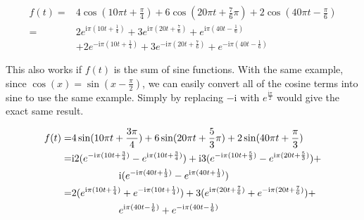 $$\begin{aligned}
    f(t) 
    =& 4\cos(10\pi t+\frac{\pi}{4}) + 6\cos(20\pi t+\frac{7}{6}\pi) + 2\cos(40\pi t-\frac{\pi}{6})  \\
    =& 2e^{\mathrm{i}\pi(10t+\frac{1}{4})} + 3e^{\mathrm{i}\pi(20t+\frac{7}{6})} + e^{\mathrm{i}\pi(40t-\frac{1}{6})} \\
    &+ 2e^{-\mathrm{i}\pi(10t+\frac{1}{4})} + 3e^{-\mathrm{i}\pi(20t+\frac{7}{6})} + e^{-\mathrm{i}\pi(40t-\frac{1}{6})}
\end{aligned}$$


\indent This also works if $f(t)$ is the sum of sine functions. With the same example, 
since $\cos(x)=\sin(x-\frac{\pi}{2})$, 
we can easily convert all of the cosine terms into sine to use the same example. 
Simply by replacing $-\mathrm{i}$ with 
$e^{\frac{\mathrm{i}\pi}{2}}$ would give the exact same result.

$$\begin{aligned}
    f(t) 
    =& 4\sin(10\pi t+\frac{3\pi}{4}) + 6\sin(20\pi t+\frac{5}{3}\pi) + 2\sin(40\pi t+\frac{\pi}{3}) \\
    =& \mathrm{i}2(e^{-\mathrm{i}\pi(10t+\frac{3}{4})} - e^{\mathrm{i}\pi(10t+\frac{3}{4})}) +
    \mathrm{i}3(e^{-\mathrm{i}\pi(10t+\frac{5}{3})} - e^{\mathrm{i}\pi(20t+\frac{5}{3})}) + \\
    &\hspace{4pc} \mathrm{i}(e^{-\mathrm{i}\pi(40t+\frac{1}{3})} - e^{\mathrm{i}\pi(40t+\frac{1}{3})})       \\
    =& 2(e^{\mathrm{i}\pi(10t+\frac{1}{4})} + e^{-\mathrm{i}\pi(10t+\frac{1}{4})} )
    + 3(e^{\mathrm{i}\pi(20t+\frac{7}{6})} + e^{-\mathrm{i}\pi(20t+\frac{7}{6})})  + \\
    &\hspace{4pc} e^{\mathrm{i}\pi(40t-\frac{1}{6})} + e^{-\mathrm{i}\pi(40t-\frac{1}{6})}
\end{aligned}$$



